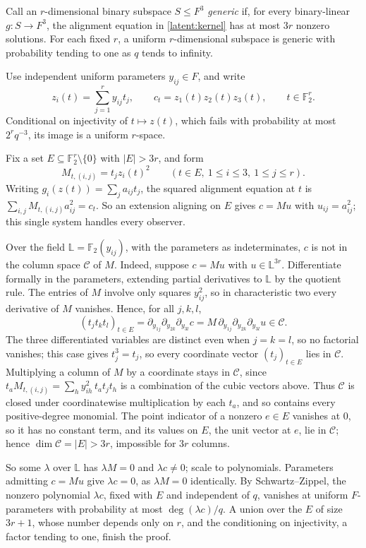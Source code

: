 \documentclass[11pt]{article}
\newcommand{\F}{\mathbb F}
\begin{document}
Call an $r$-dimensional binary subspace $S\le F^3$ \emph{generic} if, for
every binary-linear $g:S\to F^3$, the alignment equation in
\eqref{latent:kernel} has at most $3r$ nonzero solutions.
For each fixed $r$, a uniform $r$-dimensional subspace is generic with
probability tending to one as $q$ tends to infinity.

Use independent uniform parameters $y_{ij}\in F$, and write
\[
 z_i(t)=\sum_{j=1}^r y_{ij}t_j,\qquad
 c_t=z_1(t)z_2(t)z_3(t),
 \qquad t\in\F_2^r.
\]
Conditional on injectivity of $t\mapsto z(t)$, which fails with
probability at most $2^rq^{-3}$, its image is a uniform $r$-space.

Fix a set $E\subseteq\F_2^r\setminus\{0\}$ with $|E|>3r$, and form
\[
 M_{t,(i,j)}=t_jz_i(t)^2\qquad(t\in E,\ 1\le i\le3,\ 1\le j\le r).
\]
Writing $g_i(z(t))=\sum_ja_{ij}t_j$, the squared alignment equation at $t$
is $\sum_{i,j}M_{t,(i,j)}a_{ij}^2=c_t$. So an extension aligning on $E$
gives $c=Mu$ with $u_{ij}=a_{ij}^2$; this single system handles every
observer.

Over the field $\mathbb L=\F_2(y_{ij})$, with the parameters as
indeterminates, $c$ is not in the column space $\mathcal C$ of $M$. Indeed,
suppose $c=Mu$ with $u\in\mathbb L^{3r}$. Differentiate formally in the parameters, extending partial
derivatives to $\mathbb L$ by the quotient rule. The entries of $M$
involve only squares $y_{ij}^2$, so in characteristic two every
derivative of $M$ vanishes. Hence, for all $j,k,l$,
\[
 (t_jt_kt_l)_{t\in E}
 =\partial_{y_{1j}}\partial_{y_{2k}}\partial_{y_{3l}}c
 =M\,\partial_{y_{1j}}\partial_{y_{2k}}\partial_{y_{3l}}u\in \mathcal C.
\]
The three differentiated variables are distinct even when $j=k=l$, so no
factorial vanishes; this case gives $t_j^3=t_j$, so every coordinate vector
$(t_j)_{t\in E}$ lies in $\mathcal C$. Multiplying a column of $M$ by a
coordinate stays in $\mathcal C$, since
$t_aM_{t,(i,j)}=\sum_hy_{ih}^2\,t_at_jt_h$ is a combination of the cubic
vectors above. Thus $\mathcal C$ is closed under coordinatewise
multiplication by each $t_a$, and so contains every positive-degree
monomial. The point indicator of a nonzero $e\in E$ vanishes at $0$, so it
has no constant term, and its values on $E$, the unit vector at $e$, lie in
$\mathcal C$; hence $\dim \mathcal C=|E|>3r$, impossible for $3r$ columns.

So some $\lambda$ over $\mathbb L$ has $\lambda M=0$ and
$\lambda c\ne0$; scale to polynomials. Parameters admitting $c=Mu$ give
$\lambda c=0$, as $\lambda M=0$ identically. By Schwartz--Zippel, the
nonzero polynomial $\lambda c$, fixed with $E$ and independent of $q$,
vanishes at uniform $F$-parameters with probability at most $\deg(\lambda
c)/q$. A union over the $E$ of size $3r+1$, whose number depends only on
$r$, and the conditioning on injectivity, a factor tending to one, finish
the proof.
\end{document}
